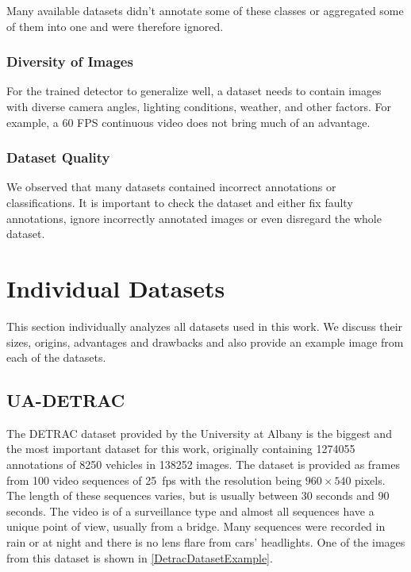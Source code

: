 Many available datasets didn't annotate some of these classes or aggregated some of them into one
and were therefore ignored.

\subsubsection*{Diversity of Images}

For the trained detector to generalize well, a dataset needs to
contain images with diverse camera angles, lighting conditions, weather, and
other factors. For example, a 60 FPS continuous video does not bring much of an
advantage.

\subsubsection*{Dataset Quality}

We observed that many datasets contained incorrect annotations or
classifications. It is important to check the dataset and either fix faulty
annotations, ignore incorrectly annotated images or even disregard the whole
dataset.



\section{Individual Datasets}


This section individually analyzes all datasets used in this work. We discuss
their sizes, origins, advantages and drawbacks and also provide an example image
from each of the datasets.


\subsection{UA-DETRAC}
\label{DetracDataset}

The DETRAC dataset \cite{detrac} provided by the University at Albany is the
biggest and the most important dataset for this work, originally containing
\num{1274055} annotations of \num{8250} vehicles in \num{138252} images. The
dataset is provided as frames from 100 video sequences of \SI{25}{fps} with the
resolution being $960 \times 540$ pixels. The length of these sequences varies,
but is usually between 30 seconds and 90 seconds. The video is of a surveillance
type and almost all sequences have a unique point of view, usually from a
bridge. Many sequences were recorded in rain or at night and there is no lens
flare from cars' headlights. One of the images from this dataset is shown in
\autoref{DetracDatasetExample}.

